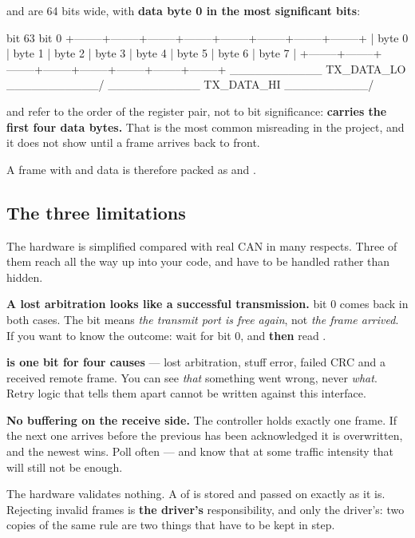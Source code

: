  and  are 64 bits wide, with \textbf{data byte 0 in the most
significant bits}:

\begin{console}
bit 63                                                              bit 0
+--------+--------+--------+--------+--------+--------+--------+--------+
| byte 0 | byte 1 | byte 2 | byte 3 | byte 4 | byte 5 | byte 6 | byte 7 |
+--------+--------+--------+--------+--------+--------+--------+--------+
 \___________ TX_DATA_LO ___________/ \___________ TX_DATA_HI __________/
\end{console}

 and  refer to the order of the register pair, not to bit significance:
\textbf{ carries the first four data bytes.} That is the most common misreading
in the project, and it does not show until a frame arrives back to front.

A frame with  and data  is therefore packed as
 and .

\subsection{The three limitations}
\label{sec:limits}

The hardware is simplified compared with real CAN in many respects. Three of them reach all the
way up into your code, and have to be handled rather than hidden.

\begin{limitation}
\textbf{A lost arbitration looks like a successful transmission.}  bit 0 comes back
in both cases. The bit means \emph{the transmit port is free again}, not \emph{the frame arrived}.
If you want to know the outcome: wait for bit 0, and \textbf{then} read .
\end{limitation}

\begin{limitation}
\textbf{ is one bit for four causes} --- lost arbitration, stuff error, failed
CRC and a received remote frame. You can see \emph{that} something went wrong, never \emph{what}.
Retry logic that tells them apart cannot be written against this interface.
\end{limitation}

\begin{limitation}
\textbf{No buffering on the receive side.} The controller holds exactly one frame. If the next one
arrives before the previous has been acknowledged it is overwritten, and the newest wins. Poll
often --- and know that at some traffic intensity that will still not be enough.
\end{limitation}

\begin{aside}
\note The hardware validates nothing. A  of  is stored and passed on
exactly as it is. Rejecting invalid frames is \textbf{the driver's} responsibility, and only the
driver's: two copies of the same rule are two things that have to be kept in step.
\end{aside}
